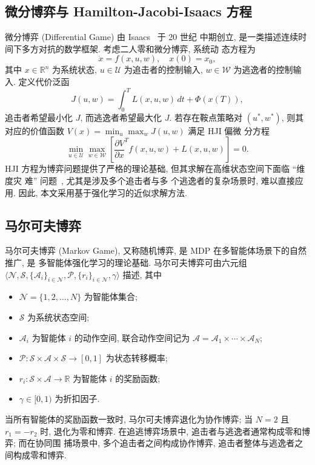 \subsection{微分博弈与 Hamilton-Jacobi-Isaacs 方程}
\label{subsec:diff_game}
微分博弈 (Differential Game) 由 Isaacs~\cite{isaacs1999differential} 于 20 世纪
中期创立, 是一类描述连续时间下多方对抗的数学框架. 考虑二人零和微分博弈, 系统动
态方程为
\begin{equation}
\dot{x} = f(x,u,w),\quad x(0)=x_0,
\end{equation}
其中 $x\in\mathbb{R}^n$ 为系统状态, $u\in\mathcal{U}$ 为追击者的控制输入,
$w\in\mathcal{W}$ 为逃逸者的控制输入. 定义代价泛函
\begin{equation}
J(u,w) = \int_0^{T} L(x,u,w)\,dt + \Phi(x(T)),
\end{equation}
追击者希望最小化 $J$, 而逃逸者希望最大化 $J$. 若存在鞍点策略对
$(u^\ast, w^\ast)$, 则其对应的价值函数 $V(x)=\min_u\max_w J(u,w)$ 满足 HJI 偏微
分方程
\begin{equation}
\min_{u\in\mathcal{U}}\max_{w\in\mathcal{W}}\left[\frac{\partial V}{\partial x}^T f(x,u,w) + L(x,u,w)\right] = 0.
\label{eq:hji}
\end{equation}
HJI 方程为博弈问题提供了严格的理论基础, 但其求解在高维状态空间下面临 ``维度灾
难'' 问题~\cite{lopez2019multiagent,garcia2020multi}, 尤其是涉及多个追击者与多
个逃逸者的复杂场景时, 难以直接应用. 因此, 本文采用基于强化学习的近似求解方法.

\subsection{马尔可夫博弈}
\label{subsec:markov_game}
马尔可夫博弈 (Markov Game), 又称随机博弈, 是 MDP 在多智能体场景下的自然推广, 是
多智能体强化学习的理论基础. 马尔可夫博弈可由六元组 $\langle \mathcal{N},
\mathcal{S}, \{\mathcal{A}_i\}_{i\in\mathcal{N}}, \mathcal{P}, \{r_i\}_{i\in\mathcal{N}},
\gamma\rangle$ 描述, 其中
\begin{itemize}
  \item $\mathcal{N}=\{1,2,\ldots,N\}$ 为智能体集合;
  \item $\mathcal{S}$ 为系统状态空间;
  \item $\mathcal{A}_i$ 为智能体 $i$ 的动作空间, 联合动作空间记为 $\mathcal{A}=\mathcal{A}_1\times\cdots\times\mathcal{A}_N$;
  \item $\mathcal{P}: \mathcal{S}\times\mathcal{A}\times\mathcal{S}\to [0,1]$ 为状态转移概率;
  \item $r_i: \mathcal{S}\times\mathcal{A}\to\mathbb{R}$ 为智能体 $i$ 的奖励函数;
  \item $\gamma\in[0,1)$ 为折扣因子.
\end{itemize}
当所有智能体的奖励函数一致时, 马尔可夫博弈退化为协作博弈; 当 $N=2$ 且 $r_1=-r_2$
时, 退化为零和博弈. 在追逃博弈场景中, 追击者与逃逸者通常构成零和博弈; 而在协同围
捕场景中, 多个追击者之间构成协作博弈, 追击者整体与逃逸者之间构成零和博弈.

